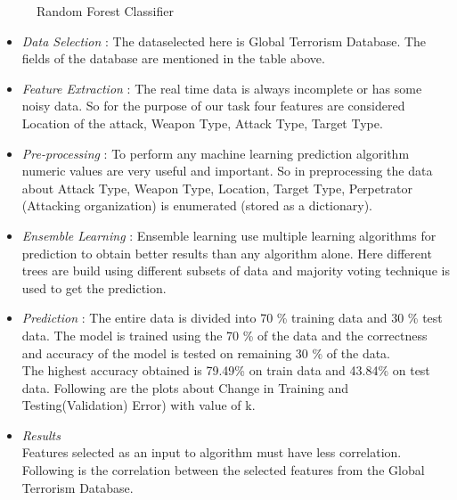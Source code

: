 \documentclass[journal,onecolumn,11pt]{IEEEtran}
\begin{document}
\begin{figure}[h!]
    \centering
    \def\svgwidth{0.4\columnwidth}
    
    
    \caption{Random Forest Classifier}
\end{figure}
\begin{itemize}
\item \textit{Data Selection} : The dataselected here is Global Terrorism Database. The fields of the database are mentioned in the table above.
\item \textit{Feature Extraction} : The real time data is always incomplete or has some noisy data. So for the purpose of our task four features are considered Location of the attack, Weapon Type, Attack Type, Target Type.
\item \textit{Pre-processing} : To perform any machine learning prediction algorithm numeric values are very useful and important. So in preprocessing the data about Attack Type, Weapon Type, Location, Target Type, Perpetrator (Attacking organization) is enumerated (stored as a dictionary).
\item \textit{Ensemble Learning} : Ensemble learning use multiple learning algorithms for prediction to obtain better results than any algorithm alone. Here different trees are build using different subsets of data and majority voting technique is used to get the prediction.
\item \textit{Prediction} : The entire data is divided into 70 \% training data and 30 \% test data. The model is trained using the 70 \% of the data and the correctness and accuracy of the model is tested on remaining 30 \% of the data.\\
The highest accuracy obtained is 79.49\% on train data and 43.84\% on test data. Following are the plots about Change in Training and Testing(Validation) Error) with value of k.

\item \textit{Results}\\
Features selected as an input to algorithm must have less correlation. Following is the correlation between the selected features from the Global Terrorism Database.



\begin{table}[h!]
\begin{tabular}{|l|l|l|l|l|l|}


\end{tabular}
\end{table}
\end{itemize}
\end{document}
